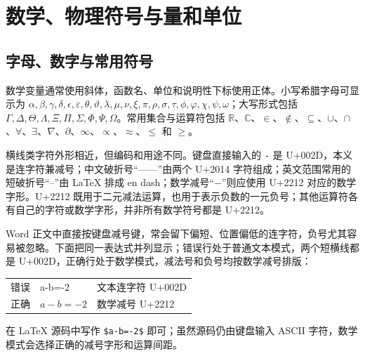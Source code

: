 \chapter{数学、物理符号与量和单位}
\label{chap:method}

\section{字母、数字与常用符号}
数学变量通常使用斜体，函数名、单位和说明性下标使用正体。小写希腊字母可显示为
$\alpha,\beta,\gamma,\delta,\epsilon,\varepsilon,\theta,\vartheta,\lambda,\mu,\nu,\xi,\pi,\rho,\sigma,\tau,\phi,\varphi,\chi,\psi,\omega$；大写形式包括
$\Gamma,\Delta,\Theta,\Lambda,\Xi,\Pi,\Sigma,\Phi,\Psi,\Omega$。常用集合与运算符包括
$\mathbb{R}$、$\mathbb{C}$、$\in$、$\notin$、$\subseteq$、$\cup$、$\cap$、$\forall$、$\exists$、$\nabla$、$\partial$、$\infty$、$\propto$、$\approx$、$\leq$ 和 $\geq$。

横线类字符外形相近，但编码和用途不同。键盘直接输入的 \verb|-| 是 U+002D，本义是连字符兼减号；中文破折号“——”由两个 U+2014 字符组成；英文范围常用的短破折号“--”由 LaTeX 排成 en dash；数学减号“$-$”则应使用 U+2212 对应的数学字形。U+2212 既用于二元减法运算，也用于表示负数的一元负号；其他运算符各有自己的字符或数学字形，并非所有数学符号都是 U+2212。

Word 正文中直接按键盘减号键，常会留下偏短、位置偏低的连字符，负号尤其容易被忽略。下面把同一表达式并列显示；错误行处于普通文本模式，两个短横线都是 U+002D，正确行处于数学模式，减法号和负号均按数学减号排版：
\begin{center}
  \begin{tabular}{cll}
    错误 & \textrm{a-b=-2} & 文本连字符 U+002D\\
    正确 & $a-b=-2$ & 数学减号 U+2212
  \end{tabular}
\end{center}
在 LaTeX 源码中写作 \verb|$a-b=-2$| 即可；虽然源码仍由键盘输入 ASCII 字符，数学模式会选择正确的减号字形和运算间距。

